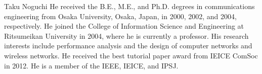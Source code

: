 \documentclass[conference]{IEEEtran}
\begin{document}
\vspace{-1.0cm}
\begin{IEEEbiography}{Taku 
Noguchi}
He received the B.E., M.E., and Ph.D. degrees in communications 
engineering from Osaka University, Osaka, Japan, in 2000, 2002, and 
2004,  respectively. He joined the College of Information Science and  
Engineering at Ritsumeikan University in 2004, where he is currently a  
professor. His research interests include performance analysis and the 
design of computer networks and wireless networks. He received the best 
tutorial paper award from IEICE ComSoc in 2012. He is a member of the  
IEEE, IEICE, and IPSJ.
\end{IEEEbiography}
  
\end{document}
